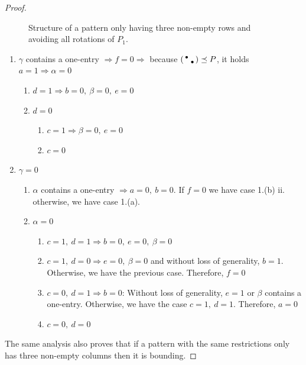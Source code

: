 \begin{proof}
\begin{figure}[!ht]
	\caption{Structure of a pattern only having three non-empty rows and avoiding all rotations of $P_1$.}
	\label{fig:threelines}
\end{figure}
\begin{enumerate}
	\item $\gamma$ contains a one-entry $\Rightarrow f=0\Rightarrow$ because $\left(\begin{smallmatrix}\bullet& \\ &\bullet\end{smallmatrix}\right)\preceq P$, it holds $a=1\Rightarrow\alpha=0$
		\begin{enumerate}
			\item $d=1\Rightarrow b=0,\ \beta=0,\ e=0$
			\item $d=0$
				\begin{enumerate}
					\item $c=1\Rightarrow\beta=0,\ e=0$
					\item $c=0$
				\end{enumerate}
		\end{enumerate}
	\item $\gamma=0$
		\begin{enumerate}
			\item $\alpha$ contains a one-entry $\Rightarrow a=0,\ b=0$. If $f=0$ we have case 1.(b) ii. otherwise, we have case 1.(a).
			\item $\alpha=0$
				\begin{enumerate}
					\item $c=1,\ d=1\Rightarrow b=0,\ e=0,\ \beta=0$
					\item $c=1,\ d=0\Rightarrow e=0,\ \beta=0$ and without loss of generality, $b=1$. Otherwise, we have the previous case. Therefore, $f=0$
					\item $c=0,\ d=1\Rightarrow b=0$: Without loss of generality, $e=1$ or $\beta$ contains a one-entry. Otherwise, we have the case $c=1,\ d=1$. Therefore, $a=0$
					\item $c=0,\ d=0$
				\end{enumerate}
		\end{enumerate}
\end{enumerate}
The same analysis also proves that if a pattern with the same restrictions only has three non-empty columns then it is bounding.


\end{proof}

